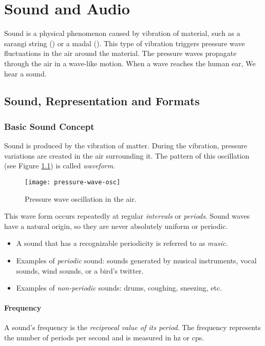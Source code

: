 \chapter{Sound and Audio}

Sound is a physical phenomenon caused by vibration of material, such as a sarangi string () or a madal (). This type of vibration triggers pressure wave fluctuations in the air around the material. The pressure waves propagate through the air in a wave-like motion. When a wave reaches the human ear, We hear a sound.




\section{Sound, Representation and Formats}
\subsection{Basic Sound Concept}
Sound is produced by the vibration of matter. During the vibration, pressure variations are created in the air surrounding it. The pattern of this oscillation (see Figure \ref{fig:oscillation}) is called \textit{waveform}. 



\begin{figure}[ht!]
	\centering
	\texttt{[image: pressure-wave-osc]}
	\caption{Pressure wave oscillation in the air.}{\label{fig:oscillation}}
\end{figure}


This wave form occurs repeatedly at regular \textit{intervals} or \textit{periods}. Sound waves have a natural origin, so they are never absolutely uniform or periodic. 
\begin{itemize}
	\item A sound that has a recognizable periodicity is referred to as \textit{music}.
	\item Examples of \textit{periodic} sound: sounds generated by musical
	instruments, vocal sounds, wind sounds, or a bird’s twitter.
	\item Examples of \textit{non-periodic} sounds: drums, coughing, sneezing, etc.
\end{itemize}

\subsubsection{Frequency}
A sound's frequency is the \textit{reciprocal value of its period}. The frequency represents the number of periods per second and is measured in \gls{hz} or \gls{cps}.

